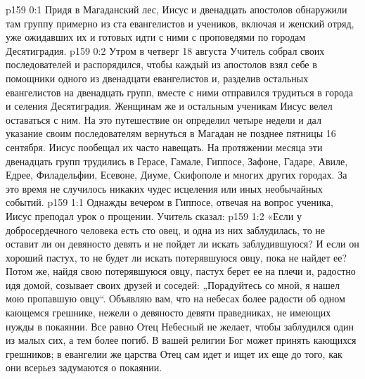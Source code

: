 \author{Комиссия срединников}
\vs p159 0:1 Придя в Магаданский лес, Иисус и двенадцать апостолов обнаружили там группу примерно из ста евангелистов и учеников, включая и женский отряд, уже ожидавших их и готовых идти с ними с проповедями по городам Десятиградия.
\vs p159 0:2 Утром в четверг 18 августа Учитель собрал своих последователей и распорядился, чтобы каждый из апостолов взял себе в помощники одного из двенадцати евангелистов и, разделив остальных евангелистов на двенадцать групп, вместе с ними отправился трудиться в города и селения Десятиградия. Женщинам же и остальным ученикам Иисус велел оставаться с ним. На это путешествие он определил четыре недели и дал указание своим последователям вернуться в Магадан не позднее пятницы 16 сентября. Иисус пообещал их часто навещать. На протяжении месяца эти двенадцать групп трудились в Герасе, Гамале, Гиппосе, Зафоне, Гадаре, Авиле, Едрее, Филадельфии, Есевоне, Диуме, Скифополе и многих других городах. За это время не случилось никаких чудес исцеления или иных необычайных событий.
\vs p159 1:1 Однажды вечером в Гиппосе, отвечая на вопрос ученика, Иисус преподал урок о прощении. Учитель сказал:
\vs p159 1:2 \pc «Если у добросердечного человека есть сто овец, и одна из них заблудилась, то не оставит ли он девяносто девять и не пойдет ли искать заблудившуюся? И если он хороший пастух, то не будет ли искать потерявшуюся овцу, пока не найдет ее? Потом же, найдя свою потерявшуюся овцу, пастух берет ее на плечи и, радостно идя домой, созывает своих друзей и соседей: „Порадуйтесь со мной, я нашел мою пропавшую овцу“. Объявляю вам, что на небесах более радости об одном кающемся грешнике, нежели о девяносто девяти праведниках, не имеющих нужды в покаянии. Все равно Отец Небесный не желает, чтобы заблудился один из малых сих, а тем более погиб. В вашей религии Бог может принять кающихся грешников; в евангелии же царства Отец сам идет и ищет их еще до того, как они всерьез задумаются о покаянии.

